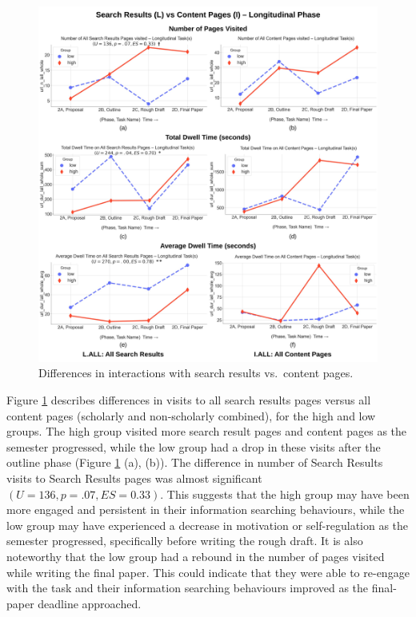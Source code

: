 \documentclass[letterpaper, nobind]{templates/ociamthesis}
\begin{document}
\begin{figure}

{\centering \includegraphics[width=1\linewidth]{figs/rp2-lvi} 

}

\caption[Differences in interactions with search results vs.~content pages - longitudinal phase.]{Differences in interactions with search results vs.~content pages.}\label{fig:rp2-lvi}
\end{figure}





Figure \ref{fig:rp2-lvi} describes differences in visits to all search results pages versus all content pages (scholarly and non-scholarly combined), for the high and low groups.
The high group visited more search result pages and content pages as the semester progressed, while the low group had a drop in these visits after the outline phase (Figure \ref{fig:rp2-lvi} (a), (b)).
The difference in number of Search Results visits to Search Results pages was almost significant \((U = 136, p = .07, ES = 0.33)\).
This suggests that the high group may have been more engaged and persistent in their information searching behaviours, while the low group may have experienced a decrease in motivation or self-regulation as the semester progressed, specifically before writing the rough draft.
It is also noteworthy that the low group had a rebound in the number of pages visited while writing the final paper. This could indicate that they were able to re-engage with the task and their information searching behaviours improved as the final-paper deadline approached.
\end{document}
